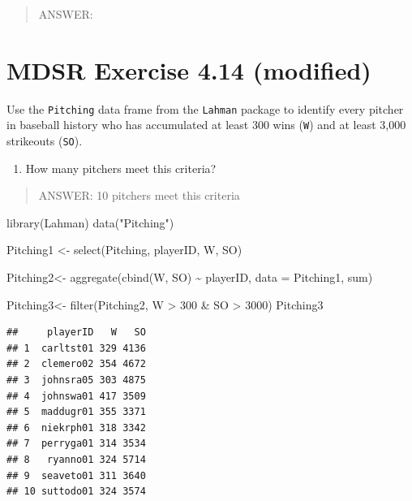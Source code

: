 \documentclass[
]{article}
\newenvironment{Shaded}{\begin{snugshade}}{\end{snugshade}}
\newcommand{\AttributeTok}[1]{\textcolor[rgb]{0.77,0.63,0.00}{#1}}
\newcommand{\DecValTok}[1]{\textcolor[rgb]{0.00,0.00,0.81}{#1}}
\newcommand{\FunctionTok}[1]{\textcolor[rgb]{0.00,0.00,0.00}{#1}}
\newcommand{\NormalTok}[1]{#1}
\newcommand{\OtherTok}[1]{\textcolor[rgb]{0.56,0.35,0.01}{#1}}
\newcommand{\SpecialCharTok}[1]{\textcolor[rgb]{0.00,0.00,0.00}{#1}}
\newcommand{\StringTok}[1]{\textcolor[rgb]{0.31,0.60,0.02}{#1}}
\providecommand{\tightlist}{%
  \setlength{\itemsep}{0pt}\setlength{\parskip}{0pt}}
\begin{document}
\begin{quote}
ANSWER:
\end{quote}

\newpage

\hypertarget{mdsr-exercise-4.14-modified}{%
\section{MDSR Exercise 4.14
(modified)}\label{mdsr-exercise-4.14-modified}}

Use the \texttt{Pitching} data frame from the \texttt{Lahman} package to
identify every pitcher in baseball history who has accumulated at least
300 wins (\texttt{W}) and at least 3,000 strikeouts (\texttt{SO}).

\begin{enumerate}
\def\labelenumi{\alph{enumi}.}
\tightlist
\item
  How many pitchers meet this criteria?
\end{enumerate}

\begin{quote}
ANSWER: 10 pitchers meet this criteria
\end{quote}

\begin{Shaded}
\begin{Highlighting}[]
\FunctionTok{library}\NormalTok{(Lahman)}
\FunctionTok{data}\NormalTok{(}\StringTok{"Pitching"}\NormalTok{)}
\end{Highlighting}
\end{Shaded}

\begin{Shaded}
\begin{Highlighting}[]
\NormalTok{Pitching1 }\OtherTok{\textless{}{-}} \FunctionTok{select}\NormalTok{(Pitching, playerID, W, SO)}

\NormalTok{Pitching2}\OtherTok{\textless{}{-}} \FunctionTok{aggregate}\NormalTok{(}\FunctionTok{cbind}\NormalTok{(W, SO) }\SpecialCharTok{\textasciitilde{}}\NormalTok{ playerID, }\AttributeTok{data =}\NormalTok{ Pitching1, sum)}

\NormalTok{Pitching3}\OtherTok{\textless{}{-}} \FunctionTok{filter}\NormalTok{(Pitching2, W }\SpecialCharTok{\textgreater{}} \DecValTok{300} \SpecialCharTok{\&}\NormalTok{ SO }\SpecialCharTok{\textgreater{}} \DecValTok{3000}\NormalTok{)}
\NormalTok{Pitching3}
\end{Highlighting}
\end{Shaded}

\begin{verbatim}
##     playerID   W   SO
## 1  carltst01 329 4136
## 2  clemero02 354 4672
## 3  johnsra05 303 4875
## 4  johnswa01 417 3509
## 5  maddugr01 355 3371
## 6  niekrph01 318 3342
## 7  perryga01 314 3534
## 8   ryanno01 324 5714
## 9  seaveto01 311 3640
## 10 suttodo01 324 3574
\end{verbatim}
\end{document}
